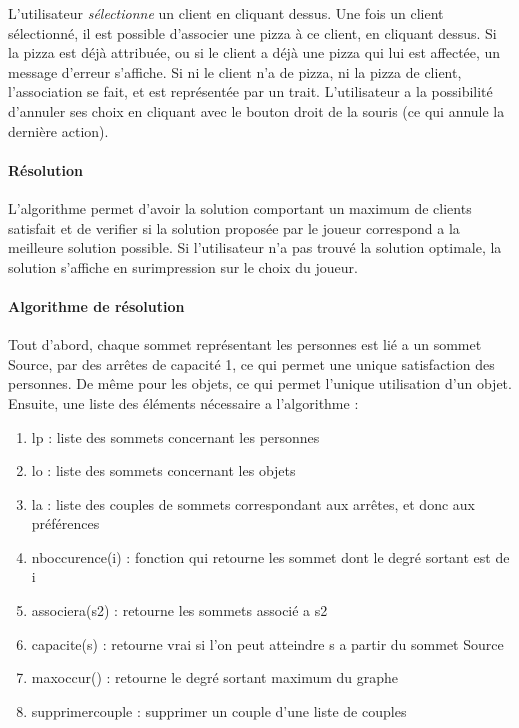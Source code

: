 		L'utilisateur \emph{sélectionne} un client en cliquant dessus.
		    Une fois un client sélectionné, il est possible
		    d'associer une pizza à ce client, en cliquant dessus.
		    Si la pizza est déjà attribuée, ou si le client a déjà
		    une pizza qui lui est affectée, un message d'erreur s'affiche.
		    Si ni le client n'a de pizza, ni la pizza de client, l'association
		    se fait, et est représentée par un trait.
		L'utilisateur a la possibilité d'annuler ses choix en cliquant avec le bouton
		    droit de la souris (ce qui annule la dernière action).
		\paragraph{Résolution}
			L'algorithme permet d'avoir la solution comportant un maximum de clients
			 satisfait et de verifier si la solution proposée par le joueur correspond
			 a la meilleure solution possible.
 			Si l'utilisateur n'a pas trouvé la solution optimale, la solution s'affiche
			 en surimpression sur le choix du joueur.

		\paragraph{Algorithme de résolution}
			Tout d'abord, chaque sommet représentant les personnes est lié a un sommet
			 Source, par des arrêtes de capacité 1, ce qui permet une unique satisfaction
			 des personnes.
			De même pour les objets, ce qui permet l'unique utilisation d'un objet.
			Ensuite, une liste des éléments nécessaire a l'algorithme :
		        \begin{enumerate}
		        	\item lp : liste des sommets concernant les personnes
		        	\item lo : liste des sommets concernant les objets
				\item la : liste des couples de sommets correspondant aux arrêtes, et donc aux préférences
				\item nboccurence(i) : fonction qui retourne les sommet dont le degré sortant est de i
				\item associera(s2) : retourne les sommets associé a s2
				\item capacite(s) : retourne vrai si l'on peut atteindre s a partir du sommet Source
				\item maxoccur() : retourne le degré sortant maximum du graphe
				\item supprimercouple : supprimer un couple d'une liste de couples
            		\end{enumerate}

